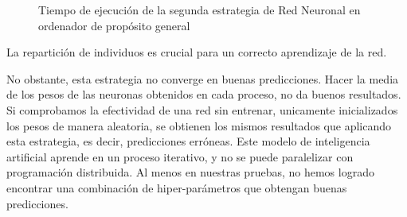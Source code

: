 			\begin{figure}[!h]
				\centering
				\caption{Tiempo de ejecución de la segunda estrategia de Red Neuronal en ordenador de propósito general}
				\label{fig:redneu_estrategia2}
			\end{figure}
			

		
			
			La repartición de individuos es crucial para un correcto aprendizaje de la red. 
			
			No obstante, esta estrategia no converge en buenas predicciones. Hacer la media de los pesos de las neuronas obtenidos en cada proceso, no da buenos resultados. Si comprobamos la efectividad de una red sin entrenar, unicamente inicializados los pesos de manera aleatoria, se obtienen los mismos resultados que aplicando esta estrategia, es decir, predicciones erróneas. Este modelo de inteligencia artificial aprende en un proceso iterativo, y no se puede paralelizar con programación distribuida. Al menos en nuestras pruebas, no hemos logrado encontrar una combinación de hiper-parámetros que obtengan buenas predicciones.
			
			